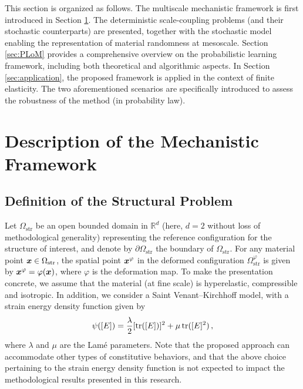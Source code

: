 This section is organized as follows. The multiscale mechanistic framework is first introduced in Section \ref{sec:mechanics}. The deterministic scale-coupling problems (and their stochastic counterparts) are presented, together with the stochastic model enabling the representation of material randomness at mesoscale. Section \ref{sec:PLoM} provides a comprehensive overview on the probabilistic learning framework, including both theoretical and algorithmic aspects. In Section \ref{sec:application}, the proposed framework is applied in the context of finite elasticity. The two aforementioned scenarios are specifically introduced to assess the robustness of the method (in probability law).

\section{Description of the Mechanistic Framework}\label{sec:mechanics}
\subsection{Definition of the Structural Problem}\label{subsec:def-struc-pb}

Let $\Omega_\text{str}$ be an open bounded domain in $\mathbb{R}^d$ (here, $d = 2$ without loss of methodological generality) representing the reference configuration for the structure of interest, and denote by $\partial \Omega_\text{str}$ the boundary of $\Omega_\text{str}$. For any material point ${\boldsymbol{x}} \in \Omega_\text{str}$, the spatial point ${\boldsymbol{x}}^\varphi$ in the deformed configuration $\Omega_{\text{str}}^\varphi$ is given by ${\boldsymbol{x}}^\varphi = \varphi ({\boldsymbol{x}})$, where $\varphi$ is the deformation map. To make the presentation concrete, we assume that the material (at fine scale) is hyperelastic, compressible and isotropic. In addition, we consider a Saint Venant–Kirchhoff model, with a strain energy density function given by
\begin{align}
    \psi([E]) = \frac{\lambda}{2} [\textnormal{tr}([E])]^2 + \mu \, \textnormal{tr}([E]^2)\,,\label{eq: strain energy density}
\end{align}
where $\lambda$ and $\mu$ are the Lamé parameters. Note that the proposed approach can accommodate other types of constitutive behaviors, and that the above choice pertaining to the strain energy density function is not expected to impact the methodological results presented in this research. 


